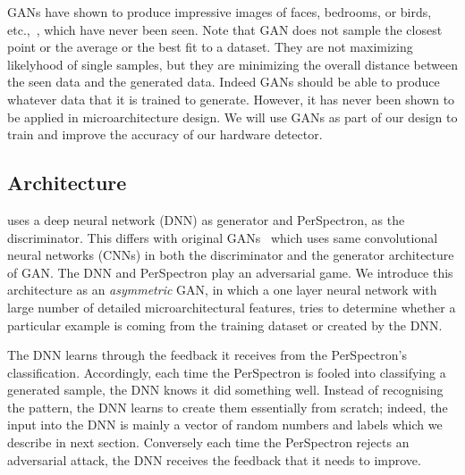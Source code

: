GANs have shown to produce impressive images of faces, bedrooms, or birds, etc.,~\cite{}, which have never been seen. Note that GAN does not sample the closest point or the average or the best fit to a dataset. They are not maximizing likelyhood of single samples, but they are minimizing the overall distance between the seen data and the generated data.  Indeed GANs should be able to produce whatever data that it is trained to generate. However, it has never been shown to be applied in microarchitecture design. We will use GANs as part of our design to train and improve the accuracy of our hardware detector.  



\subsection{{\scheme} Architecture}

{\scheme} uses a deep neural network (DNN) as generator and PerSpectron,  as the discriminator. This differs with original  GANs~\cite{goodfellow2014generative} which uses same convolutional neural
networks (CNNs) in both the discriminator and the generator
architecture of GAN.  The DNN and PerSpectron play an
adversarial game. We introduce this architecture as an {\em asymmetric} GAN, in which a one layer neural network with large number of detailed microarchitectural features, tries to determine whether a particular example is coming from the training dataset or created by the DNN. 

The DNN learns through the feedback it receives from the PerSpectron's classification. 
 Accordingly, each time the PerSpectron is fooled into classifying a generated sample, the DNN knows it did something well. Instead of recognising the pattern, the DNN learns to create them essentially from scratch; indeed, the input into the DNN is mainly a vector of random numbers and labels which we describe in next section.  Conversely each time the PerSpectron  rejects an adversarial attack, the DNN receives the feedback that it needs to improve.

